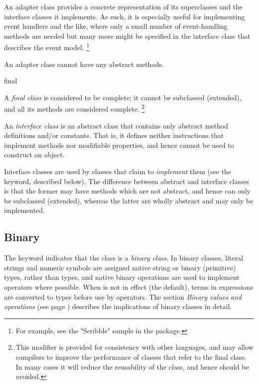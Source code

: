 \begin{description}
An adapter class provides a concrete representation of its superclasses
and the interface classes it implements.  As such, it is especially
useful for implementing event handlers and the like, where only a small
number of event-handling methods are needed but many more might be
specified in the interface class that describes the event model.
\footnote{
For example, see the "Scribble" sample in the \nr{} package.
}
 
An adapter class cannot have any abstract methods.
\item{final}

A \emph{final class} is considered to be complete; it cannot be
subclassed (extended), and all its methods are considered complete.
\footnote{
This modifier is provided for consistency with other languages, and may
allow compilers to improve the performance of classes that refer to the
final class.
In many cases it will reduce the reusability of the class, and hence
should be avoided.
}
\item[interface]\label{refinterf}

An \emph{interface class} is an abstract class that contains only
abstract method definitions and/or constants.  That is, it defines
neither instructions that implement methods nor modifiable properties,
and hence cannot be used to construct an object.
 
Interface classes are used by classes that claim to \emph{implement}
them (see the  keyword, described below).
The difference between abstract and interface classes is that
the former may have methods which are not abstract, and hence can only
be subclassed (extended), whereas the latter are wholly abstract and
may only be implemented.
\end{description}
\subsection{Binary}\label{refbincla}
 
The keyword  indicates that the class is a \emph{binary
class}.
In binary classes, literal strings and numeric symbols are assigned
native string or binary (primitive) types, rather than \nr{} types,
and native binary operations are used to implement operators where
possible.
When  is not in effect (the default), terms in
expressions are converted to \nr{} types before use by operators.
The section  \emph{Binary values and operations} (see page \pageref{refbinary}) 
describes the implications of binary classes in detail.
 
